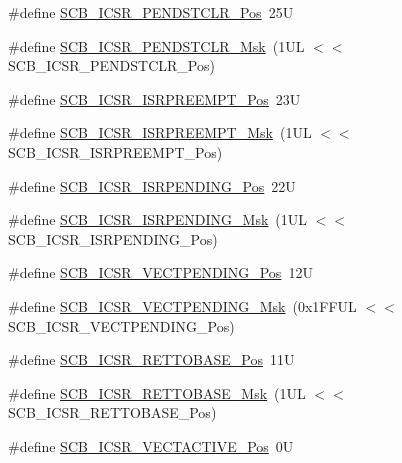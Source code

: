 \begin{DoxyCompactItemize}
\item 
\#define \hyperlink{group___c_m_s_i_s___s_c_b_gadbe25e4b333ece1341beb1a740168fdc}{S\-C\-B\-\_\-\-I\-C\-S\-R\-\_\-\-P\-E\-N\-D\-S\-T\-C\-L\-R\-\_\-\-Pos}~25\-U
\item 
\#define \hyperlink{group___c_m_s_i_s___s_c_b_gab241827d2a793269d8cd99b9b28c2157}{S\-C\-B\-\_\-\-I\-C\-S\-R\-\_\-\-P\-E\-N\-D\-S\-T\-C\-L\-R\-\_\-\-Msk}~(1\-U\-L $<$$<$ S\-C\-B\-\_\-\-I\-C\-S\-R\-\_\-\-P\-E\-N\-D\-S\-T\-C\-L\-R\-\_\-\-Pos)
\item 
\#define \hyperlink{group___c_m_s_i_s___s_c_b_ga11cb5b1f9ce167b81f31787a77e575df}{S\-C\-B\-\_\-\-I\-C\-S\-R\-\_\-\-I\-S\-R\-P\-R\-E\-E\-M\-P\-T\-\_\-\-Pos}~23\-U
\item 
\#define \hyperlink{group___c_m_s_i_s___s_c_b_gaa966600396290808d596fe96e92ca2b5}{S\-C\-B\-\_\-\-I\-C\-S\-R\-\_\-\-I\-S\-R\-P\-R\-E\-E\-M\-P\-T\-\_\-\-Msk}~(1\-U\-L $<$$<$ S\-C\-B\-\_\-\-I\-C\-S\-R\-\_\-\-I\-S\-R\-P\-R\-E\-E\-M\-P\-T\-\_\-\-Pos)
\item 
\#define \hyperlink{group___c_m_s_i_s___s_c_b_ga10749d92b9b744094b845c2eb46d4319}{S\-C\-B\-\_\-\-I\-C\-S\-R\-\_\-\-I\-S\-R\-P\-E\-N\-D\-I\-N\-G\-\_\-\-Pos}~22\-U
\item 
\#define \hyperlink{group___c_m_s_i_s___s_c_b_ga056d74fd538e5d36d3be1f28d399c877}{S\-C\-B\-\_\-\-I\-C\-S\-R\-\_\-\-I\-S\-R\-P\-E\-N\-D\-I\-N\-G\-\_\-\-Msk}~(1\-U\-L $<$$<$ S\-C\-B\-\_\-\-I\-C\-S\-R\-\_\-\-I\-S\-R\-P\-E\-N\-D\-I\-N\-G\-\_\-\-Pos)
\item 
\#define \hyperlink{group___c_m_s_i_s___s_c_b_gada60c92bf88d6fd21a8f49efa4a127b8}{S\-C\-B\-\_\-\-I\-C\-S\-R\-\_\-\-V\-E\-C\-T\-P\-E\-N\-D\-I\-N\-G\-\_\-\-Pos}~12\-U
\item 
\#define \hyperlink{group___c_m_s_i_s___s_c_b_gacb6992e7c7ddc27a370f62878a21ef72}{S\-C\-B\-\_\-\-I\-C\-S\-R\-\_\-\-V\-E\-C\-T\-P\-E\-N\-D\-I\-N\-G\-\_\-\-Msk}~(0x1\-F\-F\-U\-L $<$$<$ S\-C\-B\-\_\-\-I\-C\-S\-R\-\_\-\-V\-E\-C\-T\-P\-E\-N\-D\-I\-N\-G\-\_\-\-Pos)
\item 
\#define \hyperlink{group___c_m_s_i_s___s_c_b_ga403d154200242629e6d2764bfc12a7ec}{S\-C\-B\-\_\-\-I\-C\-S\-R\-\_\-\-R\-E\-T\-T\-O\-B\-A\-S\-E\-\_\-\-Pos}~11\-U
\item 
\#define \hyperlink{group___c_m_s_i_s___s_c_b_gaca6fc3f79bb550f64fd7df782ed4a5f6}{S\-C\-B\-\_\-\-I\-C\-S\-R\-\_\-\-R\-E\-T\-T\-O\-B\-A\-S\-E\-\_\-\-Msk}~(1\-U\-L $<$$<$ S\-C\-B\-\_\-\-I\-C\-S\-R\-\_\-\-R\-E\-T\-T\-O\-B\-A\-S\-E\-\_\-\-Pos)
\item 
\#define \hyperlink{group___c_m_s_i_s___s_c_b_gae4f602c7c5c895d5fb687b71b0979fc3}{S\-C\-B\-\_\-\-I\-C\-S\-R\-\_\-\-V\-E\-C\-T\-A\-C\-T\-I\-V\-E\-\_\-\-Pos}~0\-U
$$
\end{DoxyCompactItemize}
